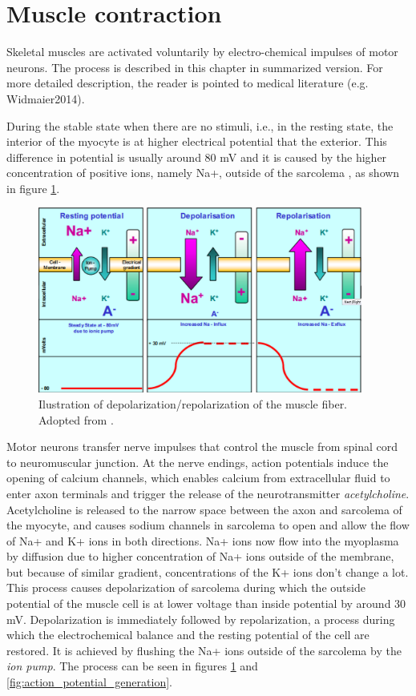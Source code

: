 \section{Muscle contraction}

Skeletal muscles are activated voluntarily by electro-chemical impulses of motor neurons. The process is described in this chapter in summarized version. For more detailed description, the reader is pointed to medical literature (e.g. {Widmaier2014}).

During the stable state when there are no stimuli, i.e., in the resting state, the interior of the myocyte is at higher electrical potential that the exterior. This difference in potential is usually around 80 mV and it is caused by the higher concentration of positive ions, namely Na+, outside of the sarcolema \citep{Nazmi2016}, as shown in figure \ref{fig:depolarization}.

\begin{figure}[ht]
\centering
\includegraphics[width=0.95\textwidth]{Images/introduction/Depolarization.png}
\caption{Ilustration of depolarization/repolarization of the muscle fiber. Adopted from \citep{Nazmi2016}.}
\label{fig:depolarization}
\end{figure}

Motor neurons transfer nerve impulses that control the muscle from spinal cord to neuromuscular junction. At the nerve endings, action potentials induce the opening of calcium channels, which enables calcium from extracellular fluid to enter axon terminals and trigger the release of the neurotransmitter \emph{acetylcholine}. Acetylcholine is released to the narrow space between the axon and sarcolema of the myocyte, and causes sodium channels in sarcolema to open and allow the flow of Na+ and K+ ions in both directions. Na+ ions now flow into the myoplasma by diffusion due to higher concentration of Na+ ions outside of the membrane, but because of similar gradient, concentrations of the K+ ions don't change a lot. This process causes depolarization of sarcolema during which the outside potential of the muscle cell is at lower voltage than inside potential by around 30 mV. Depolarization is immediately followed by repolarization, a process during which the electrochemical balance and the resting potential of the cell are restored. It is achieved by flushing the Na+ ions outside of the sarcolema by the \emph{ion pump}. The process can be seen in figures \ref{fig:depolarization} and \ref{fig:action_potential_generation}.
  
